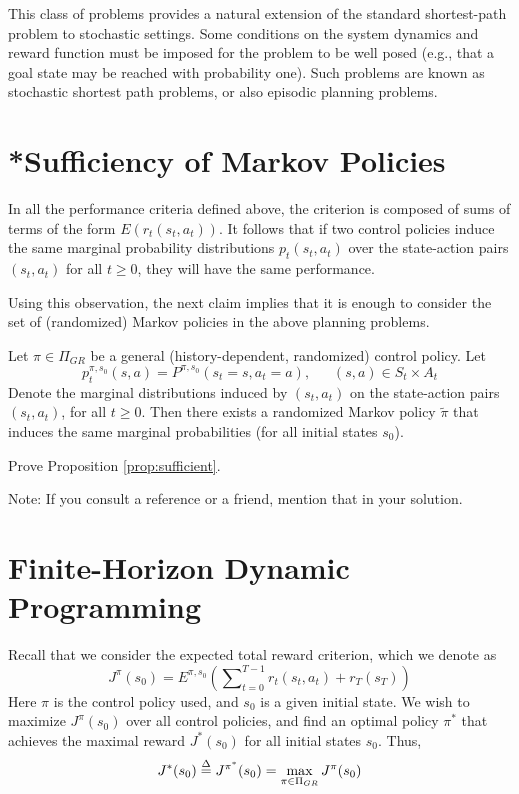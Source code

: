 This class of problems provides a natural extension of the standard shortest-path problem to stochastic settings.  Some conditions on the system dynamics and reward function must be imposed for the problem to be well posed (e.g., that a goal state may be reached  with probability one).
Such problems are known as stochastic shortest path problems, or also episodic planning problems.

\section{*Sufficiency of Markov Policies}
In all the performance criteria defined above, the criterion is composed of sums of terms of the form $E({r_t}({s_t},{a_t}))$. It follows that if two control policies induce the same marginal probability distributions ${p_t}({s_t},{a_t})$ over the state-action pairs $({s_t},{a_t})$ for all $t \ge 0$, they will have the same performance.

Using this observation, the next claim implies that it is enough to consider the set of (randomized) Markov policies in the above planning problems.

\begin{proposition}\label{prop:sufficient} Let  $\pi  \in {\Pi _{GR}}$ be a general (history-dependent, randomized) control policy.  Let
\[p_t^{\pi ,{s_0}}(s,a) = {P^{\pi ,{s_0}}}({s_t} = s,{a_t} = a),\quad \;\;(s,a) \in {S_t} \times {A_t}\]
Denote the marginal distributions induced by $({s_t},{a_t})$ on the state-action pairs $({s_t},{a_t})$, for all $t \ge 0$.
Then there exists a randomized Markov policy $\tilde \pi $ that induces the same marginal probabilities (for all initial states ${s_0}$).
\end{proposition}
\begin{exercise} Prove Proposition \ref{prop:sufficient}.

Note: If you consult a reference or a friend, mention that in your solution.
\end{exercise}


\section{Finite-Horizon Dynamic Programming}

Recall that we consider the expected total reward criterion, which we denote as
\[{J^\pi }({s_0}) = {E^{\pi ,{s_0}}}\left( {\sum\nolimits_{t = 0}^{T - 1} {{r_t}({s_t},{a_t}) + {r_T}({s_T})} } \right)\]
Here $\pi $ is the control policy used, and ${s_0}$ is a given initial state. We wish to maximize ${J^\pi }({s_0})$ over all control policies, and find an optimal policy ${\pi ^*}$ that achieves the maximal reward ${J^*}({s_0})$ for all initial states ${s_0}$.  Thus,
\[{J^*}({s_0}) \buildrel \Delta \over = {J^{\pi ^*}}({s_0}) = \mathop {\max }\limits_{\pi  \in {\Pi _{GR}}} {J^\pi }({s_0})\]


